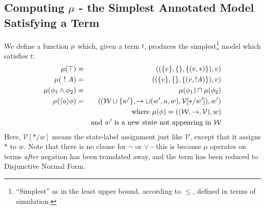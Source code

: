 \subsection{Computing $\mu$ - the Simplest Annotated Model Satisfying a Term}
We define a function $\mu$ which, given a term $t$, produces the simplest\footnote{``Simplest'' as in the least upper bound, according to $\leq$, defined in terms of simulation.} model which satisfies $t$:
\begin{eqnarray}
\mu (\top) & = & ( (\{v\}, \{\}, \{(v, \ast)\}), v) \nonumber \\
\mu (\ ! \  A) & = & ( (\{v\}, \{\}, \{(v, !A)\}), v) \nonumber \\
\mu (\phi_1 \land \phi_2) & = & \mu(\phi_1) \sqcap \mu(\phi_2) \nonumber \\
\mu (\langle a \rangle \phi) & = & ( (\mathcal{W} \cup \{w'\}, \rightarrow \cup (w', a, w), \mathcal{V} [\ast / w']), w') \nonumber \\
		& & \mbox{where }\mu(\phi) = ( (\mathcal{W}, \rightarrow, \mathcal{V}), w) \nonumber \\
		& & \mbox{and }w' \mbox{ is a new state not appearing in }\mathcal{W} \nonumber
\end{eqnarray}
Here, $\mathcal{V} [\ast/w]$ means the state-label assignment just like $\mathcal{V}$, except that it assigns $\ast$ to $w$. 
Note that there is no clause for $\neg$ or $\lor$ - this is because $\mu$ operates on terms \emph{after} negation has been translated away, and the term has been reduced to Disjunctive Normal Form. 

